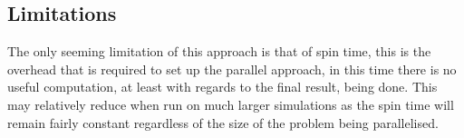 \documentclass[paper=a4, fontsize=11pt]{scrartcl}
\numberwithin{equation}{section}		%
\numberwithin{figure}{section}			%
\numberwithin{table}{section}				%
\begin{document}
\subsection{Limitations}

The only seeming limitation of this approach is that of spin time, this is the overhead that is required to set up the parallel approach, in this time there is no useful computation, at least with regards to the final result, being done. This may relatively reduce when run on much larger simulations as the spin time will remain fairly constant regardless of the size of the problem being parallelised. 

\end{document}
